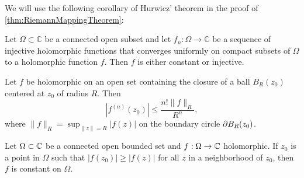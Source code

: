 We will use the following corollary of Hurwicz' theorem in the proof of \ref{thm:RiemannMappingTheorem}:
\begin{corollary} \label{thm:HurwiczCor}
    Let $\Omega \subset \mathbb{C}$ be a connected open subset and let $f_n: \Omega \to \mathbb{C}$ be a sequence of injective holomorphic functions that converges uniformly on compact subsets of $\Omega$ to a holomorphic function $f$. Then $f$ is either constant or injective.
\end{corollary}


\begin{proposition} \label{thm:CauchyInequality}
    Let $f$ be holomorphic on an open set containing the closure of a ball $B_R(z_0)$ centered at $z_0$ of radius $R$. Then $$ |f^{(n)}(z_0)|\leq \frac{n! \lVert f \rVert _R}{R^n},$$ where $ \lVert f \rVert _R= \displaystyle \sup_{\lVert z \rVert = R}|f(z)|$ on the boundary circle $\partial B_R(z_0)$.
\end{proposition}

\begin{theorem}  \label{thm:MaximumModulusPrinciple}
    Let $\Omega\subset\mathbb{C}$ be a connected open bounded set and $f:\Omega\to\mathbb{C}$ holomorphic. If $z_0$ is a point in $\Omega$ such that $|f(z_0)| \geq |f(z)|$ for all $z$ in a neighborhood of $z_0$, then $f$ is constant on $\Omega$. 
\end{theorem}

